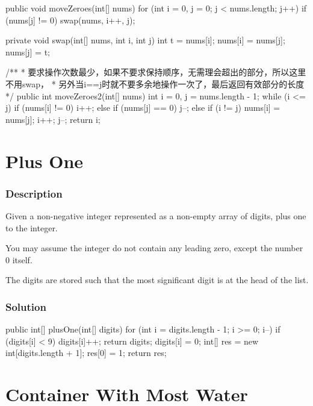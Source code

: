 \begin{Code}
public void moveZeroes(int[] nums) {
    for (int i = 0, j = 0; j < nums.length; j++) {
        if (nums[j] != 0) {
            swap(nums, i++, j);
        }
    }
}

private void swap(int[] nums, int i, int j) {
    int t = nums[i];
    nums[i] = nums[j];
    nums[j] = t;
}

/**
 * 要求操作次数最少，如果不要求保持顺序，无需理会超出的部分，所以这里不用swap，
 * 另外当i==j时就不要多余地操作一次了，最后返回有效部分的长度
 */
public int moveZeroes2(int[] nums) {
    int i = 0, j = nums.length - 1;
    while (i <= j) {
        if (nums[i] != 0) {
            i++;
        } else if (nums[j] == 0) {
            j--;
        } else {
            if (i != j) {
                nums[i] = nums[j];
            }
            i++;
            j--;
        }
    }
    return i;
}
\end{Code}

\newpage

\section{Plus One} %

\subsubsection{Description}
Given a non-negative integer represented as a non-empty array of digits, plus one to the integer.

You may assume the integer do not contain any leading zero, except the number 0 itself.

The digits are stored such that the most significant digit is at the head of the list.

\subsubsection{Solution}

\begin{Code}
public int[] plusOne(int[] digits) {
    for (int i = digits.length - 1; i >= 0; i--) {
        if (digits[i] < 9) {
            digits[i]++;
            return digits;
        }
        digits[i] = 0;
    }
    int[] res = new int[digits.length + 1];
    res[0] = 1;
    return res;
}
\end{Code}

\newpage

\section{Container With Most Water} %

